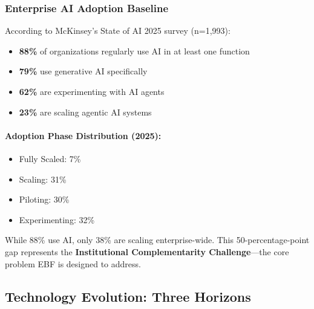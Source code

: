 \subsubsection{Enterprise AI Adoption Baseline}

According to McKinsey's State of AI 2025 survey (n=1,993):

\begin{itemize}
    \item \textbf{88\%} of organizations regularly use AI in at least one function
    \item \textbf{79\%} use generative AI specifically
    \item \textbf{62\%} are experimenting with AI agents
    \item \textbf{23\%} are scaling agentic AI systems
\end{itemize}

\paragraph{Adoption Phase Distribution (2025):}
\begin{itemize}
    \item Fully Scaled: 7\%
    \item Scaling: 31\%
    \item Piloting: 30\%
    \item Experimenting: 32\%
\end{itemize}

\begin{tcolorbox}[colback=blue!5,colframe=blue!50,title=Key Insight: The Institutional Gap]
While 88\% use AI, only 38\% are scaling enterprise-wide. This 50-percentage-point
gap represents the \textbf{Institutional Complementarity Challenge}---the core
problem EBF is designed to address.
\end{tcolorbox}


\subsection{Technology Evolution: Three Horizons}


